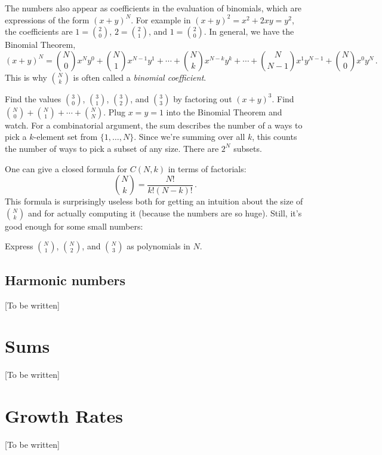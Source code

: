 \documentclass{tufte-handout}
\begin{document}
The numbers also appear as coefficients in the evaluation of
binomials, which are expressions of the form $(x+y)^N$. For example
in $(x+y)^2= x^2 + 2xy = y^2$, the coefficients are $1=\binom{2}{0}$, $2=\binom{2}{1}$, and
$1=\binom{2}{0}$. In general, we have the Binomial Theorem,
\[ (x+y)^N = \binom{N}{0} x^N y^0 +\binom{N}{1} x^{N-1}y^1+\cdots
+ \binom{N}{k} x^{N-k}y^k +\cdots+ \binom{N}{N-1} x^1y^{N-1} +
\binom{N}{0} x^0y^N\,.\] 
This is why $\binom{N}{k}$ is often called a \emph{binomial coefficient}.

\begin{ExerciseList}
  \Exercise Find the values $\binom{3}{0}$, $\binom{3}{1}$,
  $\binom{3}{2}$, and $\binom{3}{3}$ by factoring out $(x+y)^3$.
  \Exercise Find $\binom{N}{0}+\binom{N}{1}+\cdots+\binom{N}{N}$.
  \Answer Plug $x=y=1$ into the Binomial Theorem and watch. For a
  combinatorial argument, the sum describes the number of a ways to
  pick a $k$-element set from $\{1,\ldots, N\}$. Since we're summing
  over all $k$, this counts the number of ways to pick a subset of any
  size. There are $2^N$ subsets.
\end{ExerciseList}

One can give a closed formula for $C(N,k)$ in terms of factorials:
\[ \binom{N}{k}= \frac{N!}{k!(N-k)!}\,. \] 
This formula is surprisingly
useless both for getting an intuition about the size of $\binom{N}{k}$ and
for actually computing it (because the numbers are so huge).
Still, it's good enough for some small numbers:

\begin{ExerciseList}
  \Exercise Express $\binom{N}{1}$, $\binom{N}{2}$, and
  $\binom{N}{3}$ as polynomials in $N$.
\end{ExerciseList}

\subsection{Harmonic numbers}

[To be written]

\section{Sums}

[To be written]

\section{Growth Rates}

[To be written]
\end{document}
